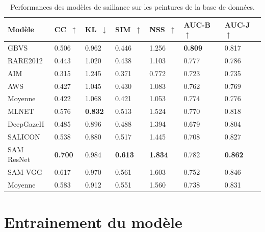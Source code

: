 \begin{table}[ht]
    \centering
        \begin{tabular}{|l|l|l|l|l|l|l|}
		\hline
        Modèle & CC~$\uparrow$ & KL~$\downarrow$ & SIM~$\uparrow$ & NSS~$\uparrow$ & AUC-B~$\uparrow$ & AUC-J~$\uparrow$\\
		\hline
        GBVS        & 0.506 & 0.962 & 0.446 & 1.256 & \textbf{0.809} & 0.817\\
        RARE2012    & 0.443 & 1.020 & 0.438 & 1.103 & 0.777 & 0.786\\
        AIM         & 0.315 & 1.245 & 0.371 & 0.772 & 0.723 & 0.735\\
        AWS         & 0.427 & 1.045 & 0.430 & 1.083 & 0.762 & 0.769\\
		\hline
        Moyenne     & 0.422 & 1.068 & 0.421 & 1.053 & 0.774 & 0.776\\
		\hline
        MLNET       & 0.576 & \textbf{0.832} & 0.513 & 1.524 & 0.770 & 0.818\\
        DeepGazeII  & 0.485 & 0.896 & 0.488 & 1.394 & 0.679 & 0.804\\
        SALICON     & 0.538 & 0.880 & 0.517 & 1.445 & 0.708 & 0.827\\
        SAM ResNet  & \textbf{0.700} & 0.984 & \textbf{0.613} & \textbf{1.834} & 0.782 & \textbf{0.862}\\
        SAM VGG     & 0.617 & 0.970 & 0.561 & 1.603 & 0.752 & 0.846\\
		\hline
        Moyenne     & 0.583 & 0.912 & 0.551 & 1.560 & 0.738 & 0.831\\
		\hline
        \end{tabular}
    \caption{Performances des modèles de saillance sur les peintures de la base de données.}
    \label{tab:scores}
\end{table}

\vfill

\section{Entrainement du modèle}
